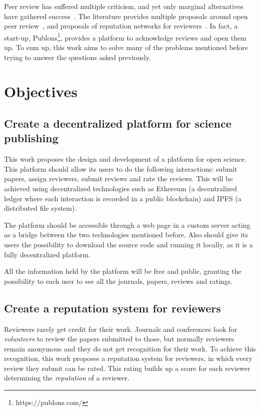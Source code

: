 Peer review has suffered multiple criticism, and yet only marginal alternatives
have gathered success~\cite{ware2008peer}. The literature provides multiple
proposals around open peer review~\cite{ford2013defining}, and proposals of
reputation networks for reviewers~\cite{frishauf2009reputation}. In fact, a
start-up, Publons\footnote{https://publons.com/}, provides a platform to
acknowledge reviews and open them up. To sum up, this work aims to solve many of
the problems mentioned before trying to answer the questions asked previously.

\section{Objectives}

\subsection*{Create a decentralized platform for science publishing}

This work proposes the design and development of a platform for open science.
This platform should allow its users to do the following interactions: submit
papers, assign reviewers, submit reviews and rate the reviews. This will be
achieved using decentralized technologies such as Ethereum (a decentralized
ledger where each interaction is recorded in a public blockchain) and IPFS (a
distributed file system).

The platform should be accessible through a web page in a custom server acting
as a bridge between the two technologies mentioned before. Also should give its
users the possibility to download the source code and running it locally, as it
is a fully decentralized platform.

All the information held by the platform will be free and public, granting the
possibility to each user to see all the journals, papers, reviews and ratings.

\subsection*{Create a reputation system for reviewers}

Reviewers rarely get credit for their work. Journals and conferences look for
\emph{volunteers} to review the papers submitted to those, but normally
reviewers remain anonymous and they do not get recognition for their work. To
achieve this recognition, this work proposes a reputation system for reviewers,
in which every review they submit can be rated. This rating builds up a score
for each reviewer determining the \emph{reputation} of a reviewer.

